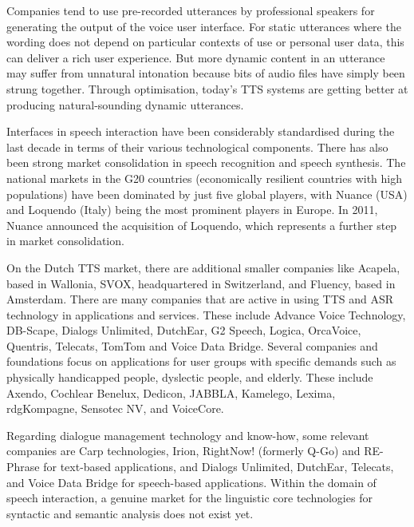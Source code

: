\documentclass[]{../../metanetpaper}
\begin{document}
\begin{multicols}{2}

Companies tend to use pre-recorded utterances by professional speakers for generating the output of the voice user interface. For static utterances where the wording does not depend on particular contexts of use or personal user data, this can deliver a rich user experience. But more dynamic content in an utterance may suffer from unnatural intonation because bits of audio files have simply been strung together. Through optimisation, today’s TTS systems are getting better at producing natural-sounding dynamic utterances.

Interfaces in speech interaction have been considerably standardised during the last decade in terms of their various technological components. There has also been strong market consolidation in speech recognition and speech synthesis. The national markets in the G20 countries (economically resilient countries with high populations) have been dominated by just five global players, with Nuance (USA) and Loquendo (Italy) being the most prominent players in Europe. In 2011, Nuance announced the acquisition of Loquendo, which represents a further step in market consolidation.

   On the Dutch TTS market, there are additional smaller companies like Acapela, based in Wallonia, SVOX, headquartered in Switzerland, and Fluency, based in Amsterdam. There are many companies that are active in using TTS and ASR technology in applications and services. These include Advance Voice Technology, DB-Scape, Dialogs Unlimited, DutchEar,   G2 Speech,  Logica, OrcaVoice, Quentris, Telecats, TomTom and Voice Data Bridge. Several companies and foundations focus on applications for user groups with specific demands such as physically handicapped people, dyslectic people, and elderly. These include Axendo, Cochlear Benelux, Dedicon, JABBLA, Kamelego, Lexima, rdgKompagne, Sensotec NV, and VoiceCore.

    Regarding dialogue management technology and know-how, some relevant companies are Carp technologies, Irion,  RightNow! (formerly Q-Go) and  RE-Phrase for text-based applications, and  Dialogs Unlimited, DutchEar, Telecats, and Voice Data Bridge for speech-based applications. Within the domain of speech interaction, a genuine market for the linguistic core technologies for syntactic and semantic analysis does not exist yet.


\end{multicols}
\end{document}

